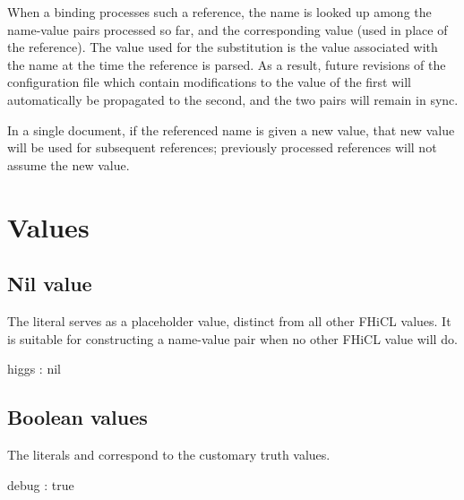 \documentclass[draftmode,draftwater]{memarticle}
\newcommand{\fhicl}%
 {FHiCL\xspace}
\begin{document}
When a binding processes such a reference,
the name is looked up
among the name-value pairs processed so far,
and the corresponding value
 (used in place of the reference).
The value used for the substitution
is the value associated with the name
at the time the reference is parsed.
As a result,
future revisions of the configuration file
which contain modifications to the value of the first
will automatically be propagated to the second,
and the two pairs will remain in sync.

In a single document,
if the referenced name is given a new value,
that new value will be used for subsequent references;
previously processed references will not assume the new value.

\chapter{Values}

%

\section{Nil value}

The literal 
serves as a placeholder value,
distinct from all other \fhicl values.
It is suitable for constructing a name-value pair
when no other \fhicl value will do.
\Needspace{0.17in}
\begin{fcllisting}[texcl,escapechar=`]
higgs : nil
\end{fcllisting}

\section{Boolean values}

The literals  and 
correspond to the customary truth values.
\Needspace{0.17in}
\begin{fcllisting}[texcl,escapechar=`]
debug : true
\end{fcllisting}
\end{document}
